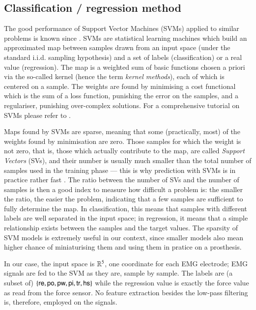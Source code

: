 \subsection{Classification / regression method}
\label{subsec:method}

The good performance of Support Vector Machines (SVMs) applied to similar
problems is known since \cite{smagt06}. SVMs are
statistical learning machines \cite{v-edbed-82} which build an approximated map between
samples drawn from an input space (under the standard i.i.d. sampling hypothesis)
and a set of labels (classification) or a real value (regression).
The map is a weighted sum of basic functions chosen a priori
via the so-called kernel (hence the term \emph{kernel methods}), each of
which is centered on a sample.
The weights are found by minimising a cost functional which is the sum of
a loss function, punishing the error on the samples, and a regulariser, punishing
over-complex solutions. For a comprehensive tutorial on SVMs please refer to
\cite{Burges98,SmolaTut2004}.

Maps found by SVMs are sparse, meaning that some (practically, most) of the
weights found by minimisation are zero.
Those samples for which the weight is not zero, that is, those which actually
contribute to the map, are called \emph{Support Vectors}
(SVs), and their number is usually much smaller
than the total number of samples used in the training phase --- this is why
prediction with SVMs is in practice rather fast \cite{Cristianini00}. The
ratio between the number of SVs and the number of samples is then a good index
to measure how difficult a problem is: the smaller the ratio, the easier
the problem, indicating that a few samples are sufficient to
fully determine the map. In classification, this means that samples with different
labels are well separated in the input space; in regression, it means that a
simple relationship exists between the samples and the target values.
The sparsity of SVM models is extremely useful in our context, since
smaller models also mean higher chance of miniaturising them and using them
in pratice on a prosthesis.

In our case, the input space is $\mathbb{R}^5$, one coordinate for each EMG
electrode; EMG signals are fed to the SVM as they are, sample by sample. The labels are
(a subset of) $\{\textsf{re},\textsf{po},\textsf{pw},\textsf{pi},\textsf{tr},\textsf{hs}\}$ while the regression value is exactly the
force value as read from the force sensor. No feature extraction besides the low-pass
filtering is, therefore, employed on the signals.

